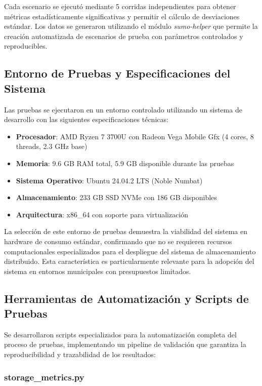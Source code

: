 \documentclass[onecolumn]{article}
\begin{document}
Cada escenario se ejecutó mediante 5 corridas independientes para obtener métricas estadísticamente significativas y permitir el cálculo de desviaciones estándar. Los datos se generaron utilizando el módulo \textit{sumo-helper} que permite la creación automatizada de escenarios de prueba con parámetros controlados y reproducibles.

\subsection{Entorno de Pruebas y Especificaciones del Sistema}

Las pruebas se ejecutaron en un entorno controlado utilizando un sistema de desarrollo con las siguientes especificaciones técnicas:

\begin{itemize}
    \item \textbf{Procesador}: AMD Ryzen 7 3700U con Radeon Vega Mobile Gfx (4 cores, 8 threads, 2.3 GHz base)
    \item \textbf{Memoria}: 9.6 GB RAM total, 5.9 GB disponible durante las pruebas
    \item \textbf{Sistema Operativo}: Ubuntu 24.04.2 LTS (Noble Numbat)
    \item \textbf{Almacenamiento}: 233 GB SSD NVMe con 186 GB disponibles
    \item \textbf{Arquitectura}: x86\_64 con soporte para virtualización
\end{itemize}

La selección de este entorno de pruebas demuestra la viabilidad del sistema en hardware de consumo estándar, confirmando que no se requieren recursos computacionales especializados para el despliegue del sistema de almacenamiento distribuido. Esta característica es particularmente relevante para la adopción del sistema en entornos municipales con presupuestos limitados.

\subsection{Herramientas de Automatización y Scripts de Pruebas}

Se desarrollaron scripts especializados para la automatización completa del proceso de pruebas, implementando un pipeline de validación que garantiza la reproducibilidad y trazabilidad de los resultados:

\subsubsection{storage\_metrics.py}
\end{document}
